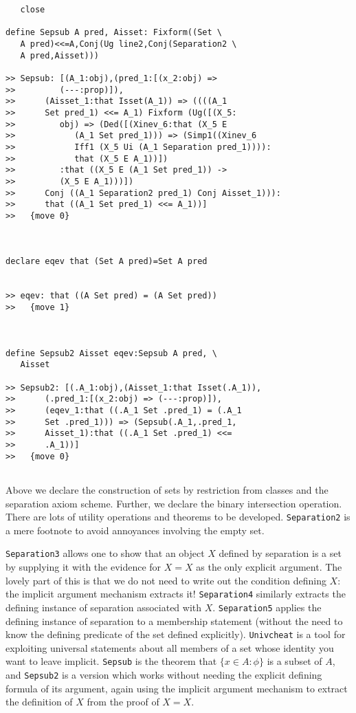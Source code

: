 \documentclass[12pt]{article}
\begin{document}
\begin{verbatim}
   close

define Sepsub A pred, Aisset: Fixform((Set \
   A pred)<<=A,Conj(Ug line2,Conj(Separation2 \
   A pred,Aisset)))

>> Sepsub: [(A_1:obj),(pred_1:[(x_2:obj) =>
>>         (---:prop)]),
>>      (Aisset_1:that Isset(A_1)) => ((((A_1
>>      Set pred_1) <<= A_1) Fixform (Ug([(X_5:
>>         obj) => (Ded([(Xinev_6:that (X_5 E
>>            (A_1 Set pred_1))) => (Simp1((Xinev_6
>>            Iff1 (X_5 Ui (A_1 Separation pred_1)))):
>>            that (X_5 E A_1))])
>>         :that ((X_5 E (A_1 Set pred_1)) ->
>>         (X_5 E A_1)))])
>>      Conj ((A_1 Separation2 pred_1) Conj Aisset_1))):
>>      that ((A_1 Set pred_1) <<= A_1))]
>>   {move 0}



declare eqev that (Set A pred)=Set A pred


>> eqev: that ((A Set pred) = (A Set pred))
>>   {move 1}



define Sepsub2 Aisset eqev:Sepsub A pred, \
   Aisset

>> Sepsub2: [(.A_1:obj),(Aisset_1:that Isset(.A_1)),
>>      (.pred_1:[(x_2:obj) => (---:prop)]),
>>      (eqev_1:that ((.A_1 Set .pred_1) = (.A_1
>>      Set .pred_1))) => (Sepsub(.A_1,.pred_1,
>>      Aisset_1):that ((.A_1 Set .pred_1) <<=
>>      .A_1))]
>>   {move 0}


\end{verbatim}

Above we declare the construction of sets by restriction from classes and the separation axiom scheme.  Further, we declare the binary intersection operation.  There are lots of utility operations and theorems to be developed.  {\tt Separation2} is a mere footnote to avoid annoyances involving the empty set.

{\tt Separation3} allows one to show that an object $X$ defined by separation is a set by supplying it with the evidence for $X=X$ as the only explicit argument.
The lovely part of this is that we do not need to write out the condition defining $X$:  the implicit argument mechanism extracts it!  {\tt Separation4} similarly extracts
the defining instance of separation associated with $X$.  {\tt Separation5} applies the defining instance of separation to a membership statement (without the need to know the defining predicate of the set defined explicitly).  {\tt Univcheat} is a tool for exploiting universal statements about all members of a set whose identity you want to leave implicit.  {\tt Sepsub} is the theorem that $\{x \in A:\phi\}$ is a subset of $A$, and {\tt Sepsub2} is a version
which works without needing the explicit defining formula of its argument, again using the implicit argument mechanism to extract the definition of $X$ from the
proof of $X=X$.
\end{document}
